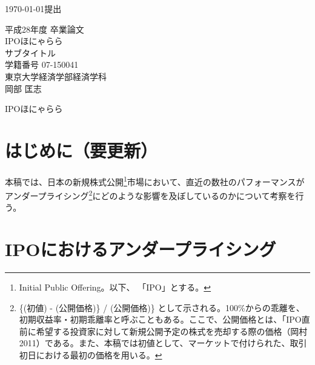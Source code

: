 \documentclass{jsarticle}
\begin{document}
\renewcommand\thefootnote{\arabic{footnote})}



{\Large \today 提出}\\ %

\begin{center}
\vspace{120truept}
{\huge 平成28年度 卒業論文\\[10mm]
IPOほにゃらら}\\ %
\vspace{10truept}
{\Large サブタイトル}\\ %
\vspace{120truept}
{\huge 学籍番号 07-150041}\\ %
\vspace{50truept}
{\huge 東京大学経済学部経済学科\\[50truept]
岡部 匡志}\\ %

\end{center}
\newpage
\begin{center}
{\Large IPOほにゃらら}\\ %
\end{center}

\tableofcontents
\vspace{120truept}
\section{はじめに（要更新）}
本稿では、日本の新規株式公開\footnote[1]{Initial Public Offering。以下、 「IPO」とする。}市場において、直近の数社のパフォーマンスがアンダープライシング\footnote[2]{\{(初値) - (公開価格)\} / (公開価格)\} として示される。100\%からの乖離を、初期収益率・初期乖離率と呼ぶこともある。ここで、公開価格とは、「IPO直前に希望する投資家に対して新規公開予定の株式を売却する際の価格（岡村 2011\cite{okamura}）である。また、本稿では初値として、マーケットで付けられた、取引初日における最初の価格を用いる。}にどのような影響を及ぼしているのかについて考察を行う。
\section{IPOにおけるアンダープライシング}
\end{document}
